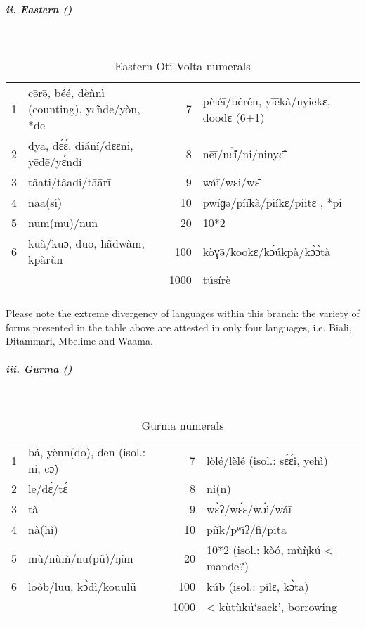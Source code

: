 \clearpage  
\subparagraph{ii. Eastern ()}
~
\begin{table}
\caption{\label{tab:3:167}Eastern Oti-Volta numerals}


\begin{tabularx}{\textwidth}{lQrQ}
\lsptoprule

{1} & c{\={ə}}r{\={ə}}, béé, dè{\`{n}}nì (counting), y{\~{ɛ}}nde/yòn, *de & {7} & pèléī/bérén, yīēkà/nyiekɛ, dood{\={ɛ}} (6+1)\\
{2} & dyā, d{\'{ɛ}}{\'{ɛ}}, diání/dɛɛni, yēdē/y{\'{ɛ}}ndí & {8} & nēī/n{\`{\~ɛ}}í/ni/niny{\={\~{ɛ}}}\\
{3} & tâati/tâadi/tāārī & {9} & wáī/wɛi/w{\={ɛ}}\\
{4} & naa(si) & {10} & pwíɡ{\={ə}}/pííkà/piíkɛ/piitɛ , *pi\\
{5} & num(mu)/nun & {20} & 10*2\\
{6} & kūà/kuɔ, dūo, h{\`ã}dwàm, kpàr{\`{u}}n & {100} & kòɣ{\={ə}}/kookɛ/k{\'{ɔ}}úkpà/k{\`{ɔ}}{\`{ɔ}}tà\\
&  & {1000} & túsírè\\
\lspbottomrule
\end{tabularx}
\end{table}

Please note the extreme divergency of languages within this branch: the variety of forms presented in the table above are attested in only four languages, i.e. Biali, Ditammari, Mbelime and Waama.


\subparagraph{iii. Gurma ()}
~
\begin{table}
\caption{\label{tab:3:168}Gurma numerals}


\begin{tabularx}{\textwidth}{lXrl}
\lsptoprule
{1} & bá, yènn(do), den (isol.: ni, c{\={\~{ɔ}}}) & {7} & lòlé/lèlé (isol.: s{\'{ɛ}}{\'{ɛ}}i, yehì)\\
{2} & le/d{\'{ɛ}}/t{\'{ɛ}} & {8} & ni(n)\\
{3} & tà & {9} & w{\`{ɛ}}ʔ/w{\'{ɛ}}ɛ/w{\'{ɔ}}ì/wáī\\
{4} & nà(hì) & {10} & píík/pʷíʔ/fi/pita\\
{5} & m{\`{u}}/n{\`{u}}{\`{m}}/nu(p{\~{u}})/ŋ{\`{u}}n & {20} & 10*2 (isol.: kòó, m{\`{u}}{\`{ŋ}}kú < mande?)\\
{6} & loòb/luu, k{\`{ɔ}}dì/kouul{\'ũ} & {100} & kúb (isol.: pílɛ, k{\`{ɔ}}ta)\\
&  & {1000} & < k{\`{u}}t{\`{u}}kú‘sack', borrowing\\
\lspbottomrule
\end{tabularx}
\end{table}

